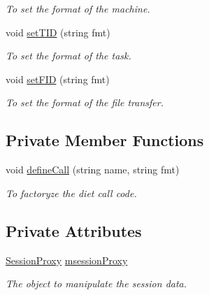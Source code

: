 \begin{DoxyCompactItemize}
\begin{DoxyCompactList}\small\item\em To set the format of the machine. \item\end{DoxyCompactList}\item 
\hypertarget{classObjectIdProxy_a99ab4e774c8bb1a175166081f02287bf}{
void \hyperlink{classObjectIdProxy_a99ab4e774c8bb1a175166081f02287bf}{setTID} (string fmt)}
\label{classObjectIdProxy_a99ab4e774c8bb1a175166081f02287bf}

\begin{DoxyCompactList}\small\item\em To set the format of the task. \item\end{DoxyCompactList}\item 
\hypertarget{classObjectIdProxy_a3d8750ae1b165e561543cc84403840c5}{
void \hyperlink{classObjectIdProxy_a3d8750ae1b165e561543cc84403840c5}{setFID} (string fmt)}
\label{classObjectIdProxy_a3d8750ae1b165e561543cc84403840c5}

\begin{DoxyCompactList}\small\item\em To set the format of the file transfer. \item\end{DoxyCompactList}\end{DoxyCompactItemize}
\subsection*{Private Member Functions}
\begin{DoxyCompactItemize}
\item 
\hypertarget{classObjectIdProxy_ac6e96fb0e849bafaf97ead83868d640e}{
void \hyperlink{classObjectIdProxy_ac6e96fb0e849bafaf97ead83868d640e}{defineCall} (string name, string fmt)}
\label{classObjectIdProxy_ac6e96fb0e849bafaf97ead83868d640e}

\begin{DoxyCompactList}\small\item\em To factoryze the diet call code. \item\end{DoxyCompactList}\end{DoxyCompactItemize}
\subsection*{Private Attributes}
\begin{DoxyCompactItemize}
\item 
\hypertarget{classObjectIdProxy_a0114470cd21f3d0bfe521421e0f3d6db}{
\hyperlink{classSessionProxy}{SessionProxy} \hyperlink{classObjectIdProxy_a0114470cd21f3d0bfe521421e0f3d6db}{msessionProxy}}
\label{classObjectIdProxy_a0114470cd21f3d0bfe521421e0f3d6db}

\begin{DoxyCompactList}\small\item\em The object to manipulate the session data. \item\end{DoxyCompactList}\end{DoxyCompactItemize}



